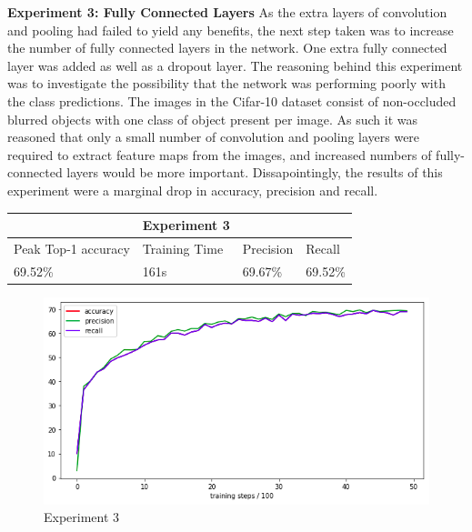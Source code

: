\documentclass[12pt]{report}
\begin{document}
\begin{flushleft}
\vspace{0.5cm}
\textbf{Experiment 3: Fully Connected Layers}
\linebreak
As the extra layers of convolution and pooling had failed to yield any benefits, the next step taken was to increase the number of fully connected layers in the network. One extra fully connected layer was added as well as a dropout layer. The reasoning behind this experiment was to investigate the possibility that the network was performing poorly with the class predictions. The images in the Cifar-10 dataset consist of non-occluded blurred objects with one class of object present per image. As such it was reasoned that only a small number of convolution and pooling layers were required to extract feature maps from the images, and increased numbers of fully-connected layers would be more important. Dissapointingly, the results of this experiment were a marginal drop in accuracy, precision and recall.

\vspace{0.5cm}
\begin{tabular}{llll}
                                          & Experiment 3                       &                                &                              \\ \hline
\multicolumn{1}{|l|}{Peak Top-1 accuracy} & \multicolumn{1}{l|}{Training Time} & \multicolumn{1}{l|}{Precision} & \multicolumn{1}{l|}{Recall}  \\ \hline
\multicolumn{1}{|l|}{69.52\%}             & \multicolumn{1}{l|}{161s}          & \multicolumn{1}{l|}{69.67\%}   & \multicolumn{1}{l|}{69.52\%} \\ \hline
\end{tabular}

\vspace{0.5cm}
\begin{figure}[ht!]
	\centering
	\includegraphics[width=12cm]{experiment-3}
	\caption{Experiment 3}
	\label{fig:experiment-3}
\end{figure}
\end{flushleft}
\end{document}
